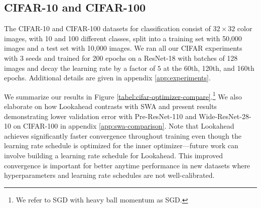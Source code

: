 \documentclass{article}
\begin{document}
\subsection{CIFAR-10 and CIFAR-100} 
\label{sec:cifar}

The CIFAR-10 and CIFAR-100 datasets for classification consist of $32 \times 32$ color images, with 10 and 100 different classes, split into a training set with 50,000 images and a test set with 10,000 images. We ran all our CIFAR experiments with 3 seeds and trained for 200 epochs on a ResNet-18 \citep{he2016deep} with batches of 128 images and decay the learning rate by a factor of $5$ at the 60th, 120th, and 160th epochs.  Additional details are given in appendix \ref{app:experiments}.

We summarize our results in Figure \ref{tabel:cifar-optimizer-compare}.\footnote{We refer to SGD with heavy ball momentum \citep{polyak1964some} as SGD.} We also elaborate on how Lookahead contrasts with SWA and present results demonstrating lower validation error with Pre-ResNet-110 and Wide-ResNet-28-10 \cite{Zagoruyko2016WRN} on CIFAR-100 in appendix \ref{app:swa-comparison}.  Note that Lookahead achieves significantly faster convergence throughout training even though the learning rate schedule is optimized for the inner optimizer---future work can involve building a learning rate schedule for Lookahead. This improved convergence is important for better anytime performance in new datasets where hyperparameters and learning rate schedules are not well-calibrated.
\end{document}
